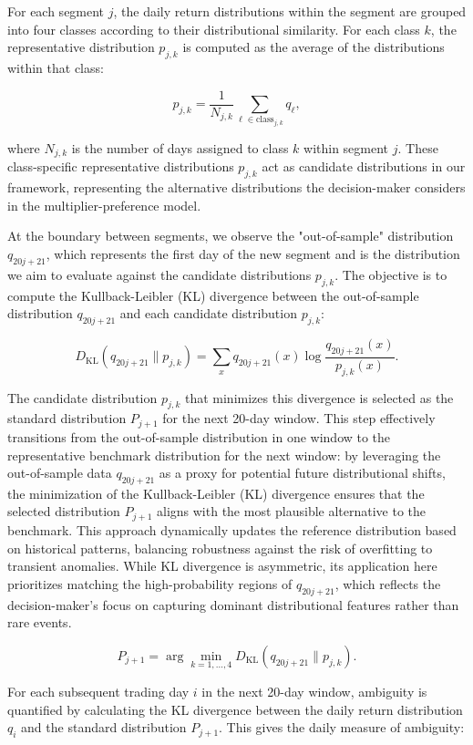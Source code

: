 \documentclass[preprint,12pt,authoryear]{elsarticle}
\begin{document}
For each segment \(j\), the daily return distributions within the segment are grouped into four classes according to their distributional similarity. For each class \(k\), the representative distribution \(p_{j,k}\) is computed as the average of the distributions within that class:

\[
p_{j,k} = \frac{1}{N_{j,k}} \sum_{\ell \in \text{class}_{j,k}} q_{\ell},
\]

where \(N_{j,k}\) is the number of days assigned to class \(k\) within segment \(j\). These class-specific representative distributions \(p_{j,k}\) act as candidate distributions in our framework, representing the alternative distributions the decision-maker considers in the multiplier-preference model.

At the boundary between segments, we observe the "out-of-sample" distribution \(q_{20j+21}\), which represents the first day of the new segment and is the distribution we aim to evaluate against the candidate distributions \(p_{j,k}\). The objective is to compute the Kullback-Leibler (KL) divergence between the out-of-sample distribution \(q_{20j+21}\) and each candidate distribution \(p_{j,k}\):

\[
D_{\mathrm{KL}}(q_{20j+21} \parallel p_{j,k}) = \sum_{x} q_{20j+21}(x) \log \frac{q_{20j+21}(x)}{p_{j,k}(x)}.
\]

The candidate distribution $p_{j,k}$ that minimizes this divergence is selected as the standard distribution $P_{j+1}$ for the next 20-day window. This step effectively transitions from the out-of-sample distribution in one window to the representative benchmark distribution for the next window: 
by leveraging the out-of-sample data $q_{20j+21}$ as a proxy for potential future distributional shifts, the minimization of the Kullback-Leibler (KL) divergence ensures that the selected distribution $P_{j+1}$ aligns with the most plausible alternative to the benchmark. This approach dynamically updates the reference distribution based on historical patterns, balancing robustness against the risk of overfitting to transient anomalies. While KL divergence is asymmetric, its application here prioritizes matching the high-probability regions of $q_{20j+21}$, which reflects the decision-maker's focus on capturing dominant distributional features rather than rare events.

\[
P_{j+1} = \arg\min_{k=1,\dots,4} D_{\mathrm{KL}}(q_{20j+21} \parallel p_{j,k}).
\]

For each subsequent trading day \(i\) in the next 20-day window, ambiguity is quantified by calculating the KL divergence between the daily return distribution \(q_i\) and the standard distribution \(P_{j+1}\). This gives the daily measure of ambiguity:
\end{document}
